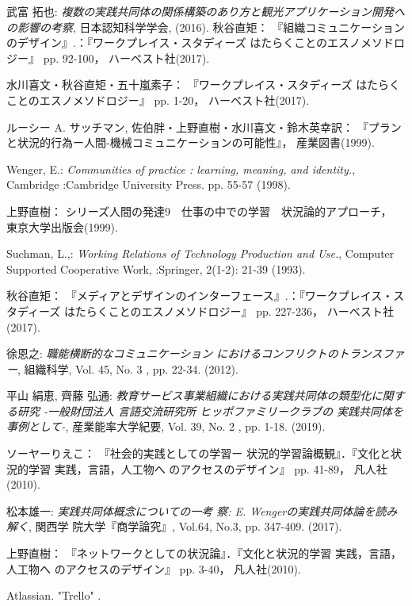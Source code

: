 \documentclass[submit,techrep]{ipsj}
\begin{document}
\begin{thebibliography}{9}


  武富 拓也: {\it 複数の実践共同体の関係構築のあり方と観光アプリケーション開発への影響の考察},
    日本認知科学学会,
    (2016).
  秋谷直矩：
  『組織コミュニケーションのデザイン』.：『ワークプレイス・スタディーズ はたらくことのエスノメソドロジー』 pp. 92-100，
  ハーベスト社(2017).

  水川喜文・秋谷直矩・五十嵐素子：
  『ワークプレイス・スタディーズ はたらくことのエスノメソドロジー』 pp. 1-20，
  ハーベスト社(2017).

ルーシー A. サッチマン, 佐伯胖・上野直樹・水川喜文・鈴木英幸訳：
『プランと状況的行為ー人間-機械コミュニケーションの可能性』，
産業図書(1999).

Wenger, E.: {\it Communities of practice : learning,
meaning, and identity.},
Cambridge :Cambridge University
Press. pp. 55-57 (1998).

上野直樹：
シリーズ人間の発達9　仕事の中での学習　状況論的アプローチ，
東京大学出版会(1999).

Suchman, L.,: {\it Working Relations of Technology Production and Use.},
Computer Supported Cooperative Work, :Springer,
2(1-2): 21-39 (1993).

  秋谷直矩：
  『メディアとデザインのインターフェース』.：『ワークプレイス・スタディーズ はたらくことのエスノメソドロジー』 pp. 227-236，
  ハーベスト社(2017).

  徐恩之: {\it 職能横断的なコミュニケーション
  におけるコンフリクトのトランスファー},
  組織科学,
  Vol. 45, No. 3 , pp. 22-34. (2012).

  平山 絹恵, 齊藤 弘通: {\it 教育サービス事業組織における実践共同体の類型化に関する研究 -一般財団法人 言語交流研究所 ヒッポファミリークラブの
実践共同体を事例として-},
  産業能率大学紀要,
  Vol. 39, No. 2 , pp. 1-18. (2019).

  ソーヤーりえこ：
  『社会的実践としての学習ー 状況的学習論概観』．『文化と状況的学習 実践，言語，人工物へ のアクセスのデザイン』 pp. 41-89，
  凡人社(2010).

  松本雄一: {\it 実践共同体概念についての一考 察: E. Wengerの実践共同体論を読み解く},
  関西学 院大学『商学論究』,
  Vol.64, No.3, pp. 347-409. (2017).

上野直樹：
『ネットワークとしての状況論』．『文化と状況的学習 実践，言語，人工物へ のアクセスのデザイン』 pp. 3-40，
凡人社(2010).

Atlassian.
"Trello"
%
.


\end{thebibliography}
\end{document}
